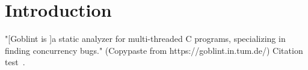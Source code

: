 
\chapter{Introduction}\label{chapter:introduction}

  "[Goblint is ]a static analyzer for multi-threaded C programs, specializing in finding concurrency bugs." (Copypaste from https://goblint.in.tum.de/)
  Citation test~\parencite{latex}.